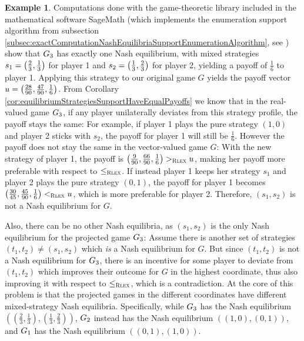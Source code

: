 \documentclass[a4paper]{scrreprt}
\theoremstyle{definition}
\newtheorem{ex}[thm]{Example} %
\begin{document}
\begin{ex}
        Computations done with the game-theoretic library included in the mathematical software {SageMath} (which implements the enumeration support algorithm from subsection \ref{subsec:exactComputationNashEquilibriaSupportEnumerationAlgorithm}, see \cite{bib:sageNormalFormGameDocumentation})
        show that $G_{3}$ has exactly one Nash equilibrium, with mixed strategies $s_1 = \bigl(\frac{2}{3}, \frac{1}{3}\bigr)$ for player 1 and $s_2 = \bigl(\frac{1}{3}, \frac{2}{3}\bigr)$ for player 2, yielding a payoff of $\frac{1}{6}$ to player 1.
        Applying this strategy to our original game $G$ yields the payoff vector $u = \bigl(\frac{28}{90}, \frac{47}{90}, \frac{1}{6}\bigr)$.
        From Corollary \ref{cor:equilibriumStrategiesSupportHaveEqualPayoffs} we know that in the real-valued game $G_{3}$, if any player unilaterally deviates from this strategy profile, the payoff stays the same: 
        For example, if player 1 plays the pure strategy $(1, 0)$ and player 2 sticks with $s_2$, the payoff for player 1 will still be $\frac{1}{6}$.
        However the payoff does not stay the same in the vector-valued game $G$:
        With the new strategy of player 1, the payoff is $\bigl(\frac{9}{90}, \frac{66}{90}, \frac{1}{6}\bigr) >_{\textsc{Rlex}} u$, making her payoff more preferable with respect to $\leq_{\textsc{Rlex}}$.
        If instead player 1 keeps her strategy $s_1$ and player 2 plays the pure strategy $(0, 1)$, the payoff for player 1 becomes $\bigl(\frac{30}{45}, \frac{45}{90}, \frac{1}{6}\bigr) <_{\textsc{Rlex}} u$, which is more preferable for player 2.
        Therefore, $(s_1, s_2)$ is not a Nash equilibrium for $G$.
            
        Also, there can be no other Nash equilibria, as $(s_1, s_2)$ is the only Nash equilibrium for the projected game $G_{3}$: Assume there is another set of strategies $(t_1, t_2) \neq (s_1, s_2)$ which \emph{is} a Nash equilibrium for $G$. But since $(t_1, t_2)$ is not a Nash equilibrium for $G_{3}$, there is an incentive for some player to deviate from $(t_1, t_2)$ which improves their outcome for $G$ in the highest coordinate, thus also improving it with respect to $\leq_{\textsc{Rlex}}$, which is a contradiction.        
        At the core of this problem is that the projected games in the different coordinates have different mixed-strategy Nash equilibria.
        Specifically, while $G_{3}$ has the Nash equilibrium $((\frac{2}{3}, \frac{1}{3}), (\frac{1}{3}, \frac{2}{3}))$,
        $G_{2}$ instead has the Nash equilibrium $((1, 0), (0, 1))$, and $G_{1}$ has the Nash equilibrium $((0, 1), (1, 0))$.
    \end{ex}
\end{document}

